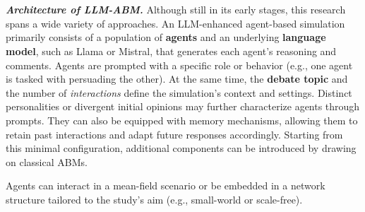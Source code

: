 \documentclass[11pt]{article}
\begin{document}
\\ \ \\
\textbf{\textit{Architecture of LLM-ABM.}}
Although still in its early stages, this research spans a wide variety of approaches. 
An LLM-enhanced agent-based simulation primarily consists of a population of \textbf{agents} and an underlying \textbf{language model}, such as Llama or Mistral, that generates each agent's reasoning and comments. 
Agents are prompted with a specific role or behavior (e.g., one agent is tasked with persuading the other). 
At the same time, the \textbf{debate topic} and the number of \textit{interactions} define the simulation's context and settings.
Distinct personalities or divergent initial opinions may further characterize agents through prompts. 
They can also be equipped with memory mechanisms, allowing them to retain past interactions and adapt future responses accordingly.
Starting from this minimal configuration, additional components can be introduced by drawing on classical ABMs. 

Agents can interact in a mean-field scenario or be embedded in a network structure tailored to the study's aim (e.g., small-world or scale-free). 
\end{document}
